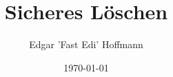 %
%
%




\title[FreieSoftwareOG.org - Sicheres Löschen]{Sicheres Löschen} %

\author{Edgar 'Fast Edi' Hoffmann}    %
\date{\today}         %




\begin{frame}      %
  \titlepage        %
\end{frame}


